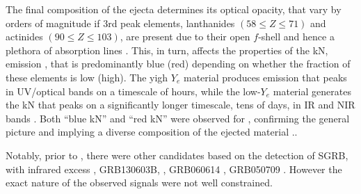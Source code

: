 
The final composition of the ejecta determines its optical opacity, that vary by orders of 
magnitude if $3$rd peak elements, lanthanides $(58\leq Z \leq71)$ and actinides 
$(90\leq Z \leq 103)$, are present due to their open $f$-shell and hence a plethora of 
absorption lines \citep{Tanaka:2013ana,Kasen:2013xka}.
%
This, in turn, affects the properties of the \ac{kN}, emission \citep{Metzger:2019zeh}, 
that is predominantly blue (red) depending on whether the fraction of these elements 
is low (high).
The yigh $Y_e$ material produces emission that peaks in \ac{UV}/optical bands on a timescale 
of hours, while the low-$Y_e$ material generates the \ac{kN} that peaks on a significantly 
longer timescale, tens of days, in \ac{IR} and \ac{NIR} bands
\citep{Barnes:2013wka,Grossman:2013lqa,Lippuner:2015gwa}.
%
Both ``blue \ac{kN}'' and ``red \ac{kN}'' were observed for \GW{}, confirming the general 
picture and implying a diverse composition of the ejected material
\citep{Arcavi:2017xiz,Coulter:2017wya,Drout:2017ijr,Evans:2017mmy,Hallinan:2017woc,
    Kasliwal:2017ngb,Nicholl:2017ahq,Smartt:2017fuw,Soares-santos:2017lru,Tanvir:2017pws,
    Troja:2017nqp,Mooley:2018dlz,Ruan:2017bha,Lyman:2018qjg}..

%
% 
Notably, prior to \AT{}, there were other candidates based on the detection of \ac{SGRB}, 
with infrared excess \eg, 
GRB130603B, \citep{Berger:2013wna,Tanvir:2013pia}, 
GRB060614 \citep{Jin:2015txa,Yang:2015pha}, 
GRB050709 \citep{Jin:2016pnm}.
However the exact nature of the observed signals were not well constrained. 
%



